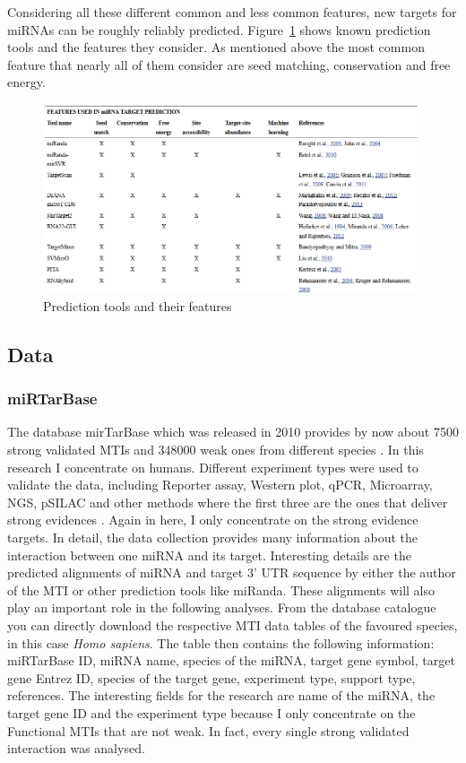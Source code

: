 \documentclass[12pt]{article}
\begin{document}
   
Considering all these different common and less common features, new targets for miRNAs can be roughly reliably predicted. Figure~\ref{fig:tools} shows known prediction tools and the features they consider. As mentioned above the most common feature that nearly all of them consider are seed matching, conservation and free energy. 


\begin{figure}
\centering
\includegraphics[scale=0.5]{results/tools.PNG}
\caption{Prediction tools and their features}
\label{fig:tools}
\end{figure}

 
\subsection{Data} 
\subsubsection{miRTarBase}
The database mirTarBase which was released in 2010 provides by now about 7500 strong validated MTIs and 348000 weak ones from different species \cite{Chou}. In this research I concentrate on humans. Different experiment types were used to validate the data, including Reporter assay, Western plot, qPCR, Microarray, NGS, pSILAC and other methods where the first three are the ones that deliver strong evidences \cite{Hsu}. Again in here, I only concentrate on the strong evidence targets. In detail, the data collection provides many information about the interaction between one miRNA and its target. Interesting details are the predicted alignments of miRNA and target 3' UTR sequence by either the author of the MTI or other prediction tools like miRanda. These alignments will also play an important role in the following analyses. From the database catalogue you can directly download the respective MTI data tables of the favoured species, in this case \textit{Homo sapiens}. The table then contains the following information: miRTarBase ID, miRNA name, species of the miRNA, target gene symbol, target gene Entrez ID, species of the target gene, experiment type, support type, references. The interesting fields for the research are name of the miRNA, the target gene ID and the experiment type because I only concentrate on the Functional MTIs that are not weak. In fact, every single strong validated interaction was analysed.\\\\
\end{document}

